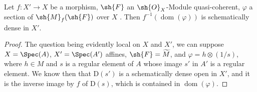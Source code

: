 \begin{proposition}[20.2.15]
\label{IV.20.2.15}
Let $f:X'\to X$ be a morphism, $\sh{F}$ an $\sh{O}_X$-Module quasi-coherent, $\varphi$ a section of $\sh{M}_f(\sh{F})$ over $X$ .
Then $f^{-1}(\operatorname{dom}(\varphi))$ is schematically dense in $X'$.
\end{proposition}

\begin{proof}
The question being evidently local on $X$ and $X'$, we can suppose $X=\Spec(A)$, $X'=\Spec(A')$ affines, $\sh{F}=\widetilde{M}$, and $\varphi=h\otimes(1/s)$, where $h\in M$ and $s$ is a regular element of $A$ whose image $s'$ in $A'$ is a regular element.
We know then  that $\mathrm{D}(s')$ is a schematically dense open in $X'$, and it is the inverse image by $f$ of $\mathrm{D}(s)$, which is contained in $\operatorname{dom}(\varphi)$.
\end{proof}

